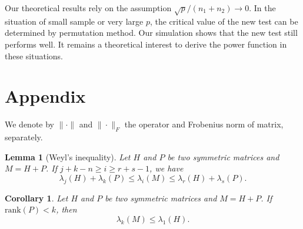 \documentclass[review]{elsarticle}
\theoremstyle{plain}
\newtheorem{corollary}[theorem]{Corollary}
\newtheorem{lemma}{Lemma}
\theoremstyle{definition}
\theoremstyle{remark}
\begin{document}

Our theoretical results rely on the assumption $\sqrt{p}/(n_1+n_2)\to 0$. In the situation of small sample or very large $p$, the critical value of the new test can be determined by permutation method. Our simulation shows that the new test still performs well. It remains a theoretical interest to derive the power function in these situations.



\section*{Appendix}
We denote by $\|\cdot \|$ and $\|\cdot\|_F$ the operator and Frobenius  norm of matrix, separately.



\begin{lemma}[Weyl's inequality]
Let $H$ and $P$ be two symmetric matrices and $M=H+P$. If $j+k-n\geq i\geq r+s-1$, we have
\begin{equation*}
\lambda_j(H)+\lambda_k(P)\leq \lambda_i(M) \leq \lambda_r(H)+\lambda_s(P).
\end{equation*}
\end{lemma}
\begin{corollary}\label{WeylCor}
    Let $H$ and $P$ be two symmetric matrices and $M=H+P$. If $\mathrm{rank}(P)< k$, then
    \begin{equation*}
        \lambda_k(M)\leq \lambda_1(H).
    \end{equation*}
\end{corollary}
\end{document}
